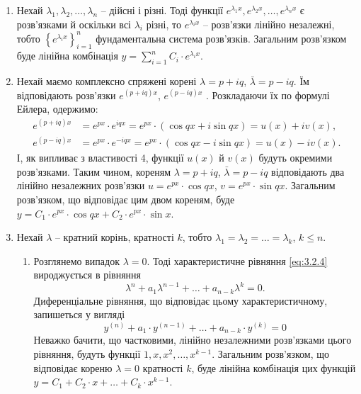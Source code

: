 \begin{enumerate}
\item Нехай $\lambda_1, \lambda_2, \ldots, \lambda_n$ -- дійсні і різні. Тоді функції $e^{\lambda_1 x}, e^{\lambda_2 x}, \ldots, e^{\lambda_n x}$ є розв’язками й оскільки всі $\lambda_i$ різні, то $e^{\lambda_i x}$ -- розв’язки лінійно незалежні, тобто $\left\{ e^{\lambda_i x} \right\}_{i = 1}^n$ фундаментальна система розв’язків. Загальним розв’язком буде лінійна комбінація $y = \sum_{i=1}^n C_i \cdot e^{\lambda_i x}$.
\item Нехай маємо комплексно спряжені корені $\lambda=p+iq$, $\bar\lambda=p-iq$. Їм відповідають розв’язки $e^{(p+iq)x}$, $e^{(p-iq)x}$ . Розкладаючи їх по формулі Ейлера, одержимо: 
\begin{align}
	\label{eq:3.2.5}
	e^{(p+iq)x} &= e^{px} \cdot e^{iqx} = e^{px} \cdot (\cos qx + i \sin qx) = u(x) + i v(x), \\
	\label{eq:3.2.6}
	e^{(p-iq)x} &= e^{px} \cdot e^{-iqx} = e^{px} \cdot (\cos qx - i \sin qx) = u(x) - i v(x).
\end{align}
І, як випливає з властивості 4, функції $u(x)$ й $v(x)$ будуть окремими розв’язками. Таким чином, кореням $\lambda = p + iq$, $\bar\lambda = p - iq$ відповідають два лінійно незалежних розв’язки $u = e^{px} \cdot \cos qx$, $v = e^{px} \cdot \sin qx$. Загальним розв’язком, що відповідає цим двом кореням, буде $y = C_1 \cdot e^{px} \cdot \cos qx + C_2 \cdot e^{px} \cdot \sin x$.
\item Нехай $\lambda$ -- кратний корінь, кратності $k$, тобто $\lambda_1 = \lambda_2 = \ldots = \lambda_k$, $k\le n$.
\begin{enumerate}
\item Розглянемо випадок $\lambda=0$. Тоді характеристичне рівняння \eqref{eq:3.2.4} вироджується в рівняння
\begin{equation*}
	\label{eq:3.2.7}
	\lambda^n + a_1 \lambda^{n - 1} + \ldots + a_{n - k} \lambda^k = 0.
\end{equation*}
 	Диференціальне рівняння, що відповідає цьому характеристичному, запишеться у вигляді
\begin{equation*}
	\label{eq:3.2.8}
	y^{(n)} + a_1 \cdot y^{(n - 1)} + \ldots + a_{n-k} \cdot y^{(k)} = 0
\end{equation*}
 	Неважко бачити, що частковими, лінійно незалежними роз\-в’я\-з\-ка\-ми цього рівняння, будуть функції $1, x, x^2, \ldots, x^{k-1}$. Загальним роз\-в’я\-з\-ком, що відповідає кореню $\lambda=0$ кратності $k$, буде лінійна комбінація цих функцій $y = C_1 + C_2 \cdot x + \ldots + C_k \cdot x^{k - 1}$.

\end{enumerate}
\end{enumerate}
